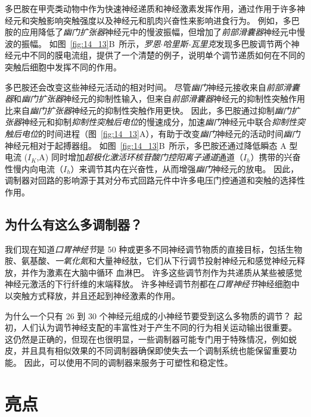 多巴胺在甲壳类动物中作为快速神经递质和神经激素发挥作用，通过作用于许多神经元和突触影响突触强度以及神经元和肌肉兴奋性来影响进食行为。
例如，多巴胺的应用降低了\textit{幽门扩张器}神经元中的慢波振幅，但增加了\textit{前部滑囊器}神经元中慢波的振幅。
如图~\ref{fig:14_13}B~所示，\textit{罗恩$\cdot$哈里斯-瓦里克}发现多巴胺调节两个神经元中不同的膜电流组，提供了一个清楚的例子，说明单个调节递质如何在不同的突触后细胞中发挥不同的作用。


多巴胺还会改变这些神经元活动的相对时间。
尽管\textit{幽门}神经元接收来自\textit{前部滑囊器}和\textit{幽门扩张器}神经元的抑制性输入，但来自\textit{前部滑囊器}神经元的抑制性突触作用比来自\textit{幽门扩张器}神经元的抑制性突触作用更快。
因此，多巴胺通过抑制\textit{幽门扩张器}神经元和抑制\textit{抑制性突触后电位}的慢速成分，加速\textit{幽门}神经元中联合\textit{抑制性突触后电位}的时间进程（图~\ref{fig:14_13}A），有助于改变\textit{幽门}神经元的活动时间\textit{幽门}神经元相对于起搏器组。
如图~\ref{fig:14_13}B~所示，多巴胺还通过降低瞬态 A 型电流 ($I_K$,A) 同时增加\textit{超极化激活环核苷酸门控阳离子通道}通道（$I_h$）携带的兴奋性慢内向电流（$I_h$）来调节其内在兴奋性，从而增强\textit{幽门}神经元的放电。
因此，调制器对回路的影响源于其对分布式回路元件中许多电压门控通道和突触的选择性作用。



\subsection{为什么有这么多调制器？}

我们现在知道\textit{口胃神经节}是 50 种或更多不同神经调节物质的直接目标，包括生物胺、氨基酸、\textit{一氧化氮}和大量神经肽，它们从下行调节投射神经元和感觉神经元释放，并作为激素在大脑中循环 血淋巴。
许多这些调节剂作为共递质从某些被感觉神经元激活的下行纤维的末端释放。
许多神经调节剂都在\textit{口胃神经节}神经细胞中以突触方式释放，并且还起到神经激素的作用。


为什么一个只有 26 到 30 个神经元组成的小神经节要受到这么多物质的调节？
起初，人们认为调节神经支配的丰富性对于产生不同的行为相关运动输出很重要。
这仍然是正确的，但现在也很明显，一些调制器可能专门用于特殊情况，例如蜕皮，并且具有相似效果的不同调制器确保即使失去一个调制系统也能保留重要功能。
因此，可以使用不同的调制器来服务于可塑性和稳定性。



\section{亮点}

